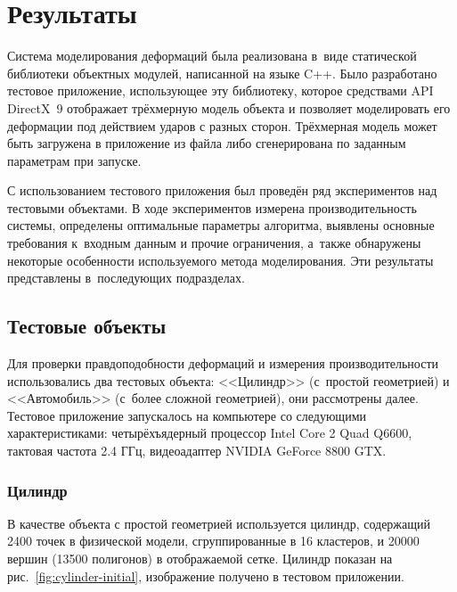 \documentclass[a4paper, 14pt, titlepage]{extarticle}
\let\oldsection\section
\renewcommand{\section}{\newpage\oldsection}
\begin{document}
  \section{Результаты}\label{sec:results}

    Система моделирования деформаций была реализована в~виде статической
    библиотеки объектных модулей, написанной на языке C++. Было разработано тестовое приложение,
    использующее эту библиотеку, которое средствами API DirectX~9 отображает трёхмерную модель
    объекта и позволяет моделировать его деформации под действием ударов с разных сторон. Трёхмерная
    модель может быть загружена в приложение из файла либо сгенерирована по заданным параметрам при
    запуске.

    С использованием тестового приложения был проведён ряд экспериментов над тестовыми объектами.
    В ходе экспериментов измерена производительность системы, определены оптимальные параметры алгоритма,
    выявлены основные требования к~входным данным и прочие ограничения, а~также обнаружены некоторые
    особенности используемого метода моделирования. Эти результаты представлены в~последующих подразделах.

    \subsection{Тестовые объекты}

      Для проверки правдоподобности деформаций и измерения производительности использовались два
      тестовых объекта: <<Цилиндр>> (с~простой геометрией) и <<Автомобиль>> (с~более сложной
      геометрией), они рассмотрены далее. Тестовое приложение запускалось на компьютере со следующими
      характеристиками: четырёхъядерный процессор Intel Core 2 Quad Q6600, тактовая частота 2.4 ГГц,
      видеоадаптер NVIDIA GeForce 8800 GTX.

      \subsubsection{Цилиндр}\label{sssec:cylinder}


        В качестве объекта с простой геометрией используется цилиндр, содержащий
        2400 точек в физической модели, сгруппированные в 16 кластеров, и 20000 вершин (13500
        полигонов) в отображаемой сетке. Цилиндр показан на рис.~\ref{fig:cylinder-initial},
        изображение получено в тестовом приложении.
\end{document}
